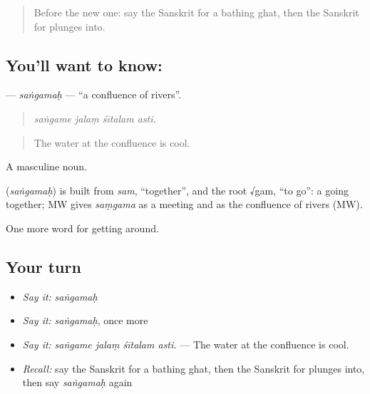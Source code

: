 \label{lesson:SA-C398-sangamah}



\begin{quote}
Before the new one: say the Sanskrit for a bathing ghat, then the Sanskrit for plunges into.
\end{quote}

\subsection*{You'll want to know: }
\textbf{} — \emph{saṅgamaḥ} — \textquotedblleft{}a confluence of rivers\textquotedblright{}.

\begin{quote}
   
\end{quote}

\begin{quote}
\emph{saṅgame jalaṃ śītalam asti.}
\end{quote}

\begin{quote}
The water at the confluence is cool.
\end{quote}

A masculine noun.

\begin{cousinweb}
\textbf{} (\emph{saṅgamaḥ}) is built from \emph{sam}, \textquotedblleft{}together\textquotedblright{}, and the root √gam, \textquotedblleft{}to go\textquotedblright{}: a going together; MW gives \emph{saṃgama} as a meeting and as the confluence of rivers (MW).
\end{cousinweb}

\begin{grammarlens}[title={What you've built}]
One more word for getting around.
\end{grammarlens}

\subsection*{Your turn}
\begin{itemize}
\raggedright
  \item \emph{Say it:} \emph{saṅgamaḥ}
  \item \emph{Say it:} \emph{saṅgamaḥ}, once more
  \item \emph{Say it:} \emph{saṅgame jalaṃ śītalam asti.} — The water at the confluence is cool.
  \item \emph{Recall:} say the Sanskrit for a bathing ghat, then the Sanskrit for plunges into, then say \emph{saṅgamaḥ} again
\end{itemize}

